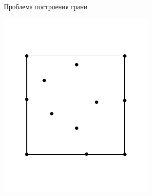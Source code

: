 \documentclass{beamer}
\begin{document}
\begin{frame}{Проблема построения грани}
\begin{minipage}{.1\textwidth}
      \end{minipage}
      \begin{minipage}{.4\textwidth}
        \centering
        \includegraphics[width=\linewidth]{affine1.pdf}
      \end{minipage}


\end{frame}
\end{document}
